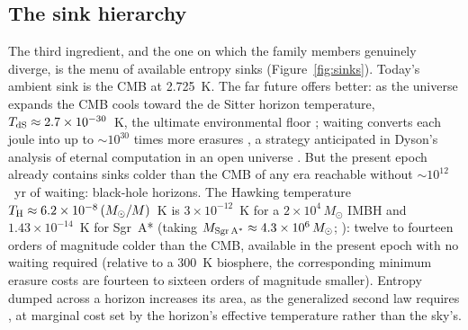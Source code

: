 \documentclass[11pt]{article}
\newcommand{\msun}{\ensuremath{M_\odot}}
\begin{document}
\subsection{The sink hierarchy}
\label{sec:sinks}

The third ingredient, and the one on which the family members genuinely diverge, is the menu of available entropy sinks (Figure~\ref{fig:sinks}). Today's ambient sink is the CMB at 2.725~K. The far future offers better: as the universe expands the CMB cools toward the de Sitter horizon temperature, $T_{\rm dS} \approx 2.7\times10^{-30}$~K, the ultimate environmental floor \citep{KraussStarkman2000}; waiting converts each joule into up to $\sim 10^{30}$ times more erasures \citep{Sandberg2016}, a strategy anticipated in Dyson's analysis of eternal computation in an open universe \citep{Dyson1979}. But the present epoch already contains sinks colder than the CMB of any era reachable without $\sim$$10^{12}$~yr of waiting: black-hole horizons. The Hawking temperature $T_{\rm H} \approx 6.2\times10^{-8}\,(\msun/M)$~K is $3\times10^{-12}$~K for a $2\times10^{4}\,\msun$ IMBH and $1.43\times10^{-14}$~K for Sgr~A* (taking $M_{\rm Sgr\,A^*} \approx 4.3\times10^{6}\,\msun$; \citealt{GRAVITY2022}): twelve to fourteen orders of magnitude colder than the CMB, available in the present epoch with no waiting required (relative to a 300~K biosphere, the corresponding minimum erasure costs are fourteen to sixteen orders of magnitude smaller). Entropy dumped across a horizon increases its area, as the generalized second law requires \citep{Bekenstein1974}, at marginal cost set by the horizon's effective temperature rather than the sky's.
\end{document}
